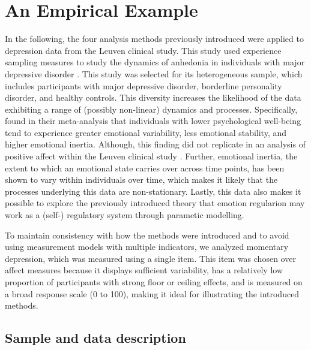 \documentclass[man, floatsintext]{apa7}
\begin{document}
\section{An Empirical Example}

In the following, the four analysis methods previously introduced were
applied to depression data from the Leuven clinical study. This study used
experience sampling measures to study the dynamics of anhedonia in
individuals with major depressive disorder \parencite{heininga_dynamical_2019}.
This study was selected for its
heterogeneous sample, which includes participants with major depressive
disorder, borderline personality disorder, and healthy controls. This diversity
increases the likelihood of the data exhibiting a range of
(possibly non-linear) dynamics
and processes. Specifically, \textcite{houben_relation_2015}
found in their meta-analysis
that individuals with lower psychological well-being tend to experience greater
emotional variability, less emotional stability, and higher emotional inertia.
Although, this finding did not replicate in an analysis of positive affect
within the Leuven clinical study \parencite{heininga_dynamical_2019}.
Further, emotional
inertia, the extent to which an emotional state carries over across
time points, has been shown to vary within individuals over time, which makes
it likely that the processes underlying this data are non-stationary.
Lastly, this data also makes it possible to explore the previously
introduced theory that emotion regularion may work as a (self-) regulatory
system through parametic modelling.

To maintain consistency with how the methods were introduced and to avoid using
measurement models with multiple indicators, we analyzed momentary
depression, which was measured using a single item. This item was chosen over
affect measures because it displays sufficient variability, has a relatively
low proportion of participants with strong floor or ceiling effects, and is
measured on a broad response scale (0 to 100), making it ideal for illustrating
the introduced methods.

\subsection{Sample and data description}
\end{document}

